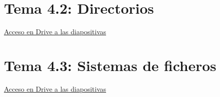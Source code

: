 \documentclass[12pt, twoside, openright]{report} %
\begin{document}
\section{Tema 4.2: Directorios}
\href{https://drive.google.com/file/d/1GN6Pwz7Nxd_eo5dzW_HUpkoLc04QEzGV}{Acceso en Drive a las diapositivas}

\section{Tema 4.3: Sistemas de ficheros}
\href{https://drive.google.com/file/d/18tmQkgEIMnQTH1K41B4H1qCyzpWmRJap}{Acceso en Drive a las diapositivas}
\end{document}
